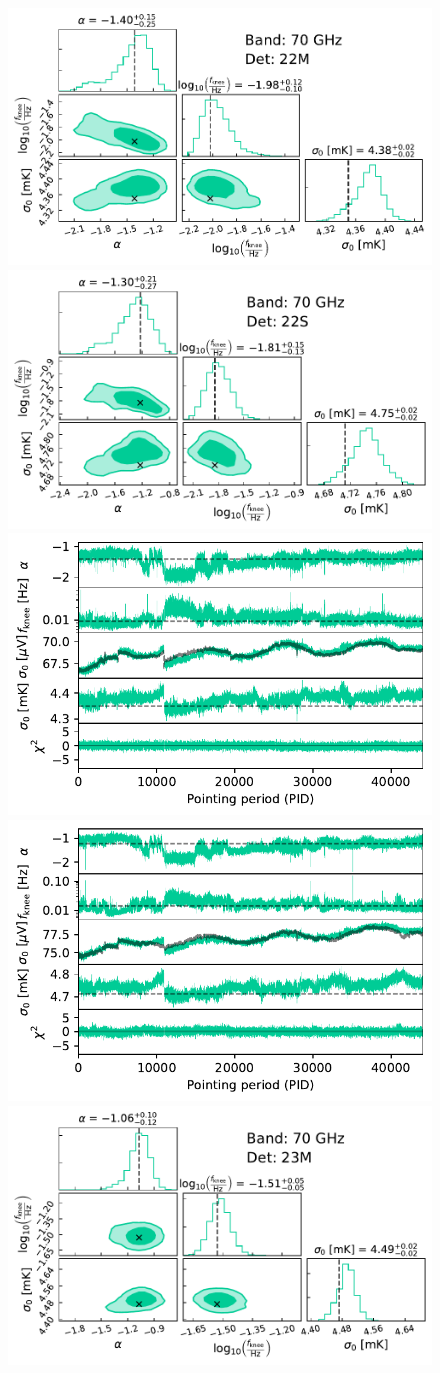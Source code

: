 \documentclass[twocolumn]{aa}
\begin{document}
\begin{figure}[p]
	\begin{center}
		\includegraphics[width=0.495\linewidth]{figs/corner_band_070_det_9_mean.pdf}
		\includegraphics[width=0.495\linewidth]{figs/corner_band_070_det_10_mean.pdf}\\
		\includegraphics[width=0.495\linewidth]{figs/xi_vs_pid_band_070_det_9_mean.pdf}
		\includegraphics[width=0.495\linewidth]{figs/xi_vs_pid_band_070_det_10_mean.pdf}\\
		\vspace*{0.5mm}
		\includegraphics[width=0.495\linewidth]{figs/corner_band_070_det_11_mean.pdf}

\end{center}
\end{figure}
\end{document}
